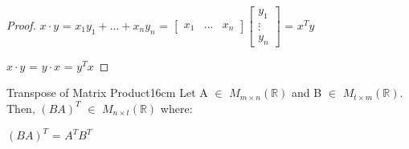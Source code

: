     \begin{proof}
        $x \cdot y$
        = $x_1y_1 + ... + x_ny_n$ =
        $\begin{bmatrix}
            x_1 & ... & x_n
        \end{bmatrix}
        \begin{bmatrix}
            y_1 \\
            \vdots \\
            y_n
        \end{bmatrix}$
        = $x^T y$

        $x \cdot y$ = $y \cdot x$ = $y^T x$
    \end{proof}

    \vspace{0.5cm}



    \begin{wtheorem}{Transpose of Matrix Product}{16cm}
        Let A $\in$ $M_{m \times n}(\mathbb{R})$
        and B $\in$ $M_{t \times m}(\mathbb{R})$.
        Then, $(BA)^T$ $\in$ $M_{n \times t}(\mathbb{R})$ where:

        \hspace{0.5cm}
        $(BA)^T$ = $A^T B^T$
    \end{wtheorem}

